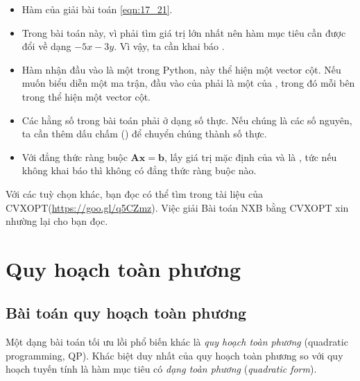 \begin{itemize}
\item Hàm  của  giải bài toán \eqref{eqn:17_21}.

\item Trong bài toán này, vì phải tìm giá trị lớn nhất nên hàm mục tiêu cần được đổi về dạng $-5x - 3y$. Vì vậy, ta cần khai báo .

\item Hàm  nhận đầu vào là một  trong Python,  này thể hiện một vector cột. Nếu muốn biểu diễn một ma trận, đầu vào của  phải là một  của , trong đó mỗi  bên trong thể hiện một vector cột.

\item Các hằng số trong bài toán phải ở dạng số thực. Nếu chúng là các số
nguyên, ta cần thêm dấu chấm () để chuyển chúng thành số thực.

\item Với đẳng thức ràng buộc $\mathbf{Ax} = \mathbf{b}$,
 lấy giá trị mặc định của  và
 là , tức nếu không khai báo thì không có đẳng thức ràng buộc nào.

\end{itemize}
Với các tuỳ chọn khác, bạn đọc có thể tìm trong tài liệu của CVXOPT(\url{https://goo.gl/q5CZmz}).
Việc giải Bài toán NXB bằng CVXOPT xin nhường lại cho bạn đọc.

\section{Quy hoạch toàn phương}

\subsection{Bài toán quy hoạch toàn phương}
Một dạng bài toán tối ưu lồi phổ biến khác là \textit{quy hoạch toàn phương} (quadratic
programming, QP). Khác biệt duy nhất của quy hoạch toàn phương so
với quy hoạch tuyến tính là hàm mục tiêu có \textit{dạng toàn phương} (\textit{quadratic form}).


